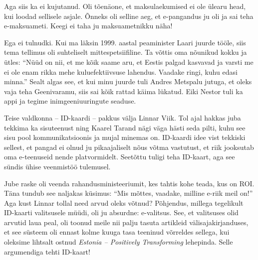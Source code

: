 
Aga siis ka ei kujutanud. Oli tõenäone, et maksulaekumised ei ole ülearu head, 
kui loodad sellisele asjale. Õnneks oli selline aeg, et 
e-pangandus ju oli ja sai teha e-maksuameti. Keegi ei taha ju maksuametnikku näha! 


Ega ei tulnudki. Kui ma läksin 1999. aastal peaminister Laari juurde tööle, siis tema tellimus oli suhteliselt mittespetsiifiline. Ta võttis oma nõunikud kokku ja ütles: \enquote{Nüüd 
on nii, et me kõik saame aru, et Eestis palgad kasvavad ja varsti me ei 
ole enam rikka mehe kuluefektiivsuse lahendus. Vaadake ringi, kuhu edasi minna.} 
Sealt algas see, et kui minu juurde tuli Andres 
Metspalu jutuga, et oleks vaja teha 
Geenivaramu, siis sai kõik rattad käima lükatud. Eiki 
Nestor tuli ka appi ja tegime inimgeeniuuringute 
seaduse. 

Teise valdkonna -- ID-kaardi -- pakkus välja Linnar 
Viik. Tol ajal 
hakkas juba tekkima ka sisuteenust ning Kaarel Tarand nägi 
väga hästi seda pilti, kuhu see sisu pool kommunikatsioonis ja mujal
minemas on. ID-kaardi idee vist tekkiski sellest, et 
pangad ei olnud ju pikaajaliselt nõus võtma vastutust, et riik jooksutab oma 
e-teenuseid nende platvormidelt. Seetõttu tuligi teha ID-kaart, aga see 
sündis ühise veenmistöö tulemusel. 

Jube raske oli veenda rahandusministeeriumit, kes tahtis kohe 
teada, kus on ROI. Täna tundub see naljakas küsimus: \enquote{Mis 
mõttes, vaadake, milline e-riik meil on!} Aga kust Linnar tollal need arvud oleks võtnud? Põhjendus, 
millega tegelikult ID-kaarti valitsusele müüdi, oli ju absurdne: e-valitsus. See, et valitsuses olid 
arvutid laua peal, oli toonud meile nii palju tasuta artikleid 
välisajakirjanduses, et see süsteem oli ennast kolme kuuga tasa teeninud 
võrreldes sellega, kui oleksime lihtsalt ostnud \emph{Estonia -- Positively 
Transforming} lehepinda. Selle argumendiga 
tehti ID-kaart! 

